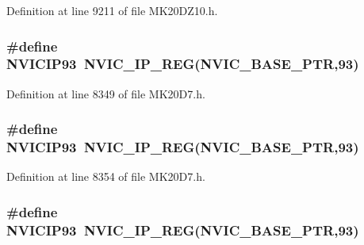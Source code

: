 Definition at line 9211 of file M\+K20\+D\+Z10.\+h.

\subsubsection[{\texorpdfstring{N\+V\+I\+C\+I\+P93}{NVICIP93}}]{\setlength{\rightskip}{0pt plus 5cm}\#define N\+V\+I\+C\+I\+P93~{\bf N\+V\+I\+C\+\_\+\+I\+P\+\_\+\+R\+EG}({\bf N\+V\+I\+C\+\_\+\+B\+A\+S\+E\+\_\+\+P\+TR},93)}\hypertarget{group___n_v_i_c___register___accessor___macros_gabaea7b989542052a1355bafe5aed5a1a}{}\label{group___n_v_i_c___register___accessor___macros_gabaea7b989542052a1355bafe5aed5a1a}


Definition at line 8349 of file M\+K20\+D7.\+h.

\subsubsection[{\texorpdfstring{N\+V\+I\+C\+I\+P93}{NVICIP93}}]{\setlength{\rightskip}{0pt plus 5cm}\#define N\+V\+I\+C\+I\+P93~{\bf N\+V\+I\+C\+\_\+\+I\+P\+\_\+\+R\+EG}({\bf N\+V\+I\+C\+\_\+\+B\+A\+S\+E\+\_\+\+P\+TR},93)}\hypertarget{group___n_v_i_c___register___accessor___macros_gabaea7b989542052a1355bafe5aed5a1a}{}\label{group___n_v_i_c___register___accessor___macros_gabaea7b989542052a1355bafe5aed5a1a}


Definition at line 8354 of file M\+K20\+D7.\+h.

\subsubsection[{\texorpdfstring{N\+V\+I\+C\+I\+P93}{NVICIP93}}]{\setlength{\rightskip}{0pt plus 5cm}\#define N\+V\+I\+C\+I\+P93~{\bf N\+V\+I\+C\+\_\+\+I\+P\+\_\+\+R\+EG}({\bf N\+V\+I\+C\+\_\+\+B\+A\+S\+E\+\_\+\+P\+TR},93)}\hypertarget{group___n_v_i_c___register___accessor___macros_gabaea7b989542052a1355bafe5aed5a1a}{}\label{group___n_v_i_c___register___accessor___macros_gabaea7b989542052a1355bafe5aed5a1a}


